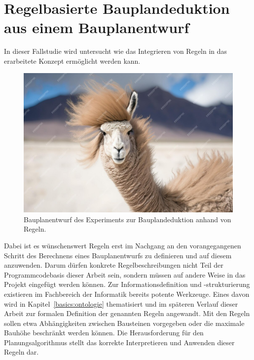 \section{Regelbasierte Bauplandeduktion aus einem Bauplanentwurf}\label{scenarios:scenario4}
In dieser Fallstudie wird untersucht wie das Integrieren von Regeln in das erarbeitete Konzept ermöglicht werden kann.
\begin{figure}[ht]
  \centering
  \includegraphics[width=0.5\columnwidth]{fig/TODO.jpg}
  \caption{Bauplanentwurf des Experiments zur Bauplandeduktion anhand von Regeln.}\label{fig:scenarios:Scenario4 Experiment}
\end{figure}
Dabei ist es wünschenswert Regeln erst im Nachgang an den vorangegangenen Schritt des Berechnens eines Bauplanentwurfs zu definieren und auf diesem anzuwenden.
Darum dürfen konkrete Regelbeschreibungen nicht Teil der Programmcodebasis dieser Arbeit sein, sondern müssen auf andere Weise in das Projekt eingefügt werden können.
Zur Informationsdefinition und -strukturierung existieren im Fachbereich der Informatik bereits potente Werkzeuge.
Eines davon wird in Kapitel~\ref{basics:ontologie} thematisiert und im späteren Verlauf dieser Arbeit zur formalen Definition der genannten Regeln angewandt.
Mit den Regeln sollen etwa Abhängigkeiten zwischen Bausteinen vorgegeben oder die maximale Bauhöhe beschränkt werden können.
Die Herausforderung für den Planungsalgorithmus stellt das korrekte Interpretieren und Anwenden dieser Regeln dar.
